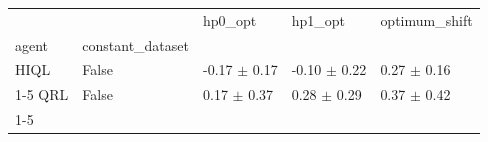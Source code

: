 \begin{tabular}{lllll}
\toprule
 &  & hp0_opt & hp1_opt & optimum_shift \\
agent & constant_dataset &  &  &  \\
\midrule
HIQL & False & -0.17 $\pm$ 0.17 & -0.10 $\pm$ 0.22 & 0.27 $\pm$ 0.16 \\
\cline{1-5}
QRL & False & 0.17 $\pm$ 0.37 & 0.28 $\pm$ 0.29 & 0.37 $\pm$ 0.42 \\
\cline{1-5}
\bottomrule
\end{tabular}
